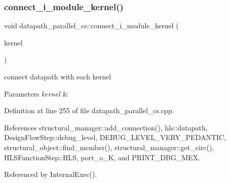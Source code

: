 \mbox{\label{classdatapath__parallel__cs_a13170eb5321f0a469bad1b7db4c1cd9a}} 
\subsubsection{\texorpdfstring{connect\+\_\+i\+\_\+module\+\_\+kernel()}{connect\_i\_module\_kernel()}}
{\footnotesize\ttfamily void datapath\+\_\+parallel\+\_\+cs\+::connect\+\_\+i\+\_\+module\+\_\+kernel (\begin{DoxyParamCaption}\item[{\hyperlink{structural__objects_8hpp_a8ea5f8cc50ab8f4c31e2751074ff60b2}{structural\+\_\+object\+Ref}}]{kernel }\end{DoxyParamCaption})\hspace{0.3cm}{\ttfamily [protected]}}



connect datapath with each kernel 


\begin{DoxyParams}{Parameters}
{\em kernel} & \\
\hline
\end{DoxyParams}


Definition at line 255 of file datapath\+\_\+parallel\+\_\+cs.\+cpp.



References structural\+\_\+manager\+::add\+\_\+connection(), hls\+::datapath, Design\+Flow\+Step\+::debug\+\_\+level, D\+E\+B\+U\+G\+\_\+\+L\+E\+V\+E\+L\+\_\+\+V\+E\+R\+Y\+\_\+\+P\+E\+D\+A\+N\+T\+IC, structural\+\_\+object\+::find\+\_\+member(), structural\+\_\+manager\+::get\+\_\+circ(), H\+L\+S\+Function\+Step\+::\+H\+LS, port\+\_\+o\+\_\+K, and P\+R\+I\+N\+T\+\_\+\+D\+B\+G\+\_\+\+M\+EX.



Referenced by Internal\+Exec().

